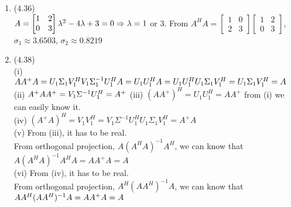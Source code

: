 \documentclass[letterpaper,12pt]{article}
\theoremstyle{definition}
\begin{document}
\begin{enumerate}
 	\item (4.36) \\
$A = \begin{bmatrix} 1&2\\0&3  \end{bmatrix}\\
\lambda^2-4\lambda+3=0 \Rightarrow \lambda = 1$ or $3.$
From $A^HA=\begin{bmatrix} 1&0\\2&3  \end{bmatrix} \begin{bmatrix} 1&2\\0&3  \end{bmatrix}$, \\$\sigma_1 \approx 3.6503$, $\sigma_2\approx 0.8219
$




 	\item (4.38) \\
(i) $AA^+A = U_1\Sigma_1V_1^HV_1\Sigma_1^{-1}U_1^HA = U_1U_1^HA = U_1U_1^HU_1\Sigma_1V_1^H = U_1\Sigma_1V_1^H =A \\$
(ii) $A^+AA^+=V_1\Sigma^{-1}U_1^H = A^+\\$
(iii) $(AA^+)^H=U_1U_1^H=AA^+$ from (i) we can easily know it.\\
(iv) $ (A^+A)^H = V_1V_1^H = V_1\Sigma^{-1}U_1^HU_1\Sigma_1V_1^H = A^+A $\\
(v) From (iii), it has to be real.\\
From orthogonal projection, $A(A^HA)^{-1}A^H$, we can know that $A(A^HA)^{-1}A^HA = AA^+A = A$ \\
(vi) From (iv), it has to be real.\\
From orthogonal projection, $A^H(AA^H)^{-1}A$, we can know that $AA^H(AA^H)^{-1}A = AA^+A = A\\
$






















\end{enumerate}

\vspace{25mm}


\end{document}
